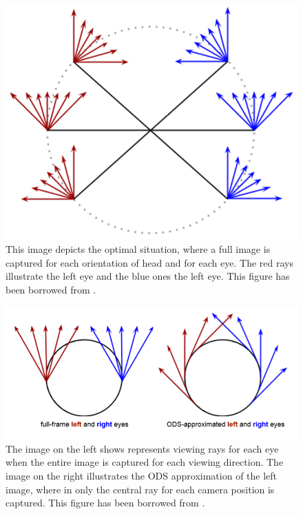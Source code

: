 \documentclass[10pt,twocolumn,letterpaper]{article}
\begin{document}
\begin{figure}[t]
\begin{center}
   \includegraphics[width=0.5\linewidth]{pictures/wanted.png}
\end{center}
   \caption{This image depicts the optimal situation, where a full image is captured for each orientation of head and for each eye. The red rays illustrate the left eye and the blue ones the left eye. This figure has been borrowed from \cite{ods}.}
\label{wanted}
\end{figure}

\begin{figure}[t]
\begin{center}
	\includegraphics[width=0.8\linewidth]{pictures/approxi.png}
\end{center}
   \caption{The image on the left shows represents viewing rays for each eye when the entire image is captured for each viewing direction. The image on the right illustrates the ODS approximation of the left image, where in only the central ray for each camera position is captured. This figure has been borrowed from \cite{ods}.}
\label{approx}
\end{figure}
\end{document}
